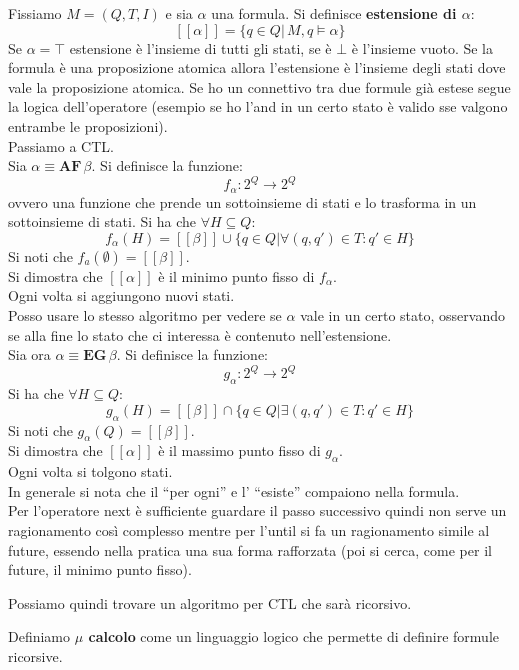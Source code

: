 \documentclass[a4paper,12pt, oneside]{book}
\begin{document}
\begin{definizione}
  Fissiamo $M=(Q,T,I)$ e sia $\alpha$ una formula. Si definisce
  \textbf{estensione di $\alpha$}:
  \[[[\alpha]]=\{q\in Q|\,M,q\vDash \alpha\}\]
  Se $\alpha=\top$ estensione è l'insieme di tutti gli stati, se è $\bot$ è
  l'insieme vuoto. Se la formula è una proposizione atomica allora l'estensione
  è l'insieme degli stati dove vale la proposizione atomica. Se ho un connettivo
  tra due formule già estese segue la logica dell'operatore (esempio se ho l'and
  in un certo stato è valido sse valgono entrambe le proposizioni).\\
  Passiamo a CTL.\\
  Sia $\alpha\equiv\mathbf{AF}\,\beta$. Si
  definisce la funzione:
  \[f_\alpha:2^Q\to 2^Q\]
  ovvero una funzione che prende un sottoinsieme di stati e lo trasforma in un
  sottoinsieme di stati. Si ha che $\forall H\subseteq Q$:
  \[f_\alpha(H)=[[\beta]]\cup\{q\in Q|\forall(q,q')\in T:q'\in H\}\]
  Si noti che $f_a(\emptyset)=[[\beta]]$.\\
  Si dimostra che $[[\alpha]]$ è il minimo punto fisso di $f_\alpha$.\\
  Ogni volta si aggiungono nuovi stati.\\
  Posso usare lo stesso algoritmo per vedere se $\alpha$ vale in un certo stato,
  osservando se alla fine lo stato che ci interessa è contenuto
  nell'estensione.\\
  Sia ora $\alpha\equiv \mathbf{EG}\,\beta$. Si
  definisce la funzione:
  \[g_\alpha:2^Q\to 2^Q\]
  Si ha che $\forall H\subseteq Q$:
  \[g_\alpha(H)=[[\beta]]\cap\{q\in Q|\exists(q,q')\in T:q'\in H\}\]
  Si noti che $g_\alpha(Q)=[[\beta]]$.\\
  Si dimostra che $[[\alpha]]$ è il massimo punto fisso di $g_\alpha$.\\
  Ogni volta si tolgono stati.\\
  In generale si nota che il ``per ogni'' e l' ``esiste'' compaiono nella
  formula.\\
  Per l'operatore next è sufficiente guardare il passo successivo quindi non
  serve un ragionamento così complesso mentre per l'until si fa un ragionamento
  simile al future, essendo nella pratica una sua forma rafforzata (poi si
  cerca, come per il future, il minimo punto fisso).
\end{definizione}
Possiamo quindi trovare un algoritmo per CTL che sarà ricorsivo.
\begin{definizione}
  Definiamo \textbf{$\mu$ calcolo} come un linguaggio logico che permette di
  definire formule ricorsive.  
\end{definizione}
\end{document}
